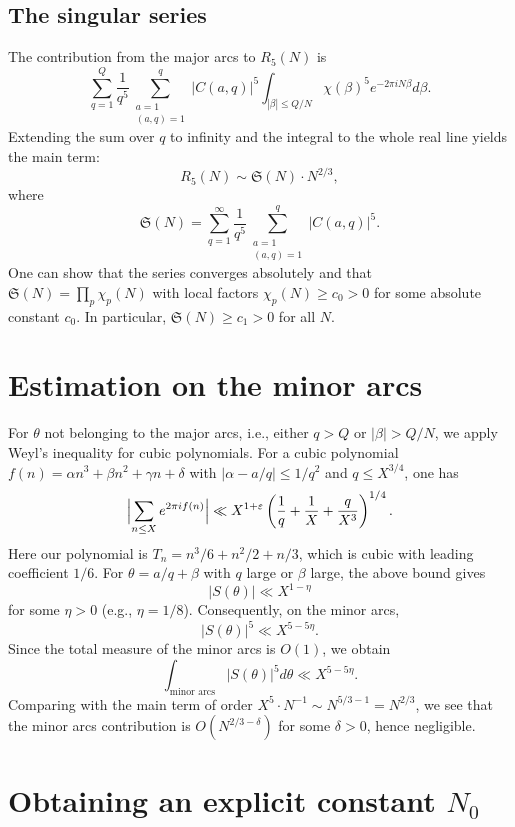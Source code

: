 \documentclass[11pt,a4paper]{article}
\begin{document}
\subsection{The singular series}

The contribution from the major arcs to \(R_5(N)\) is
\[
\sum_{q=1}^{Q} \frac{1}{q^5} \sum_{\substack{a=1\\ (a,q)=1}}^{q} |C(a,q)|^5 \int_{|\beta|\le Q/N} \chi(\beta)^5 e^{-2\pi i N\beta} d\beta.
\]
Extending the sum over \(q\) to infinity and the integral to the whole real line yields the main term:
\[
R_5(N) \sim \mathfrak{S}(N) \cdot N^{2/3},
\]
where
\[
\mathfrak{S}(N) = \sum_{q=1}^{\infty} \frac{1}{q^5} \sum_{\substack{a=1\\ (a,q)=1}}^{q} |C(a,q)|^5.
\]
One can show that the series converges absolutely and that \(\mathfrak{S}(N) = \prod_{p} \chi_p(N)\) with local factors \(\chi_p(N) \ge c_0 > 0\) for some absolute constant \(c_0\). In particular, \(\mathfrak{S}(N) \ge c_1 > 0\) for all \(N\).

\section{Estimation on the minor arcs}

For \(\theta\) not belonging to the major arcs, i.e., either \(q > Q\) or \(|\beta| > Q/N\), we apply Weyl's inequality for cubic polynomials. For a cubic polynomial \(f(n) = \alpha n^3 + \beta n^2 + \gamma n + \delta\) with \(|\alpha - a/q| \le 1/q^2\) and \(q \le X^{3/4}\), one has
\[
\Bigl|\sum_{n\le X} e^{2\pi i f(n)}\Bigr| \ll X^{1+\varepsilon} \left(\frac{1}{q} + \frac{1}{X} + \frac{q}{X^3}\right)^{1/4}.
\]
Here our polynomial is \(T_n = n^3/6 + n^2/2 + n/3\), which is cubic with leading coefficient \(1/6\). For \(\theta = a/q + \beta\) with \(q\) large or \(\beta\) large, the above bound gives
\[
|S(\theta)| \ll X^{1-\eta}
\]
for some \(\eta>0\) (e.g., \(\eta=1/8\)). Consequently, on the minor arcs,
\[
|S(\theta)|^5 \ll X^{5-5\eta}.
\]
Since the total measure of the minor arcs is \(O(1)\), we obtain
\[
\int_{\text{minor arcs}} |S(\theta)|^5 d\theta \ll X^{5-5\eta}.
\]
Comparing with the main term of order \(X^5 \cdot N^{-1} \sim N^{5/3-1} = N^{2/3}\), we see that the minor arcs contribution is \(O(N^{2/3 - \delta})\) for some \(\delta>0\), hence negligible.

\section{Obtaining an explicit constant \(N_0\)}
\end{document}
